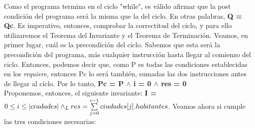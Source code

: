 \documentclass[10pt,a4paper]{article}
\begin{document}
Como el programa termina en el ciclo "while", es válido afirmar que la post condición del programa será la misma que la del ciclo. En otras palabras, \textbf{Q = Qc}. Es imperativo, entonces, comprobar la correctitud del ciclo, y para ello utilizaremos el Teorema del Invariante y el Teorema de Terminación.
Veamos, en primer lugar, cuál es la precondición del ciclo. Sabemos que esta será la precondición del programa, más cualquier instrucción hasta llegar al comienzo del ciclo. Entonces, podemos decir que, como P es todas las condiciones establecidas en los \textit{requiere}, entonces Pc lo será también, sumadas las dos instrucciones antes de llegar al ciclo. Por lo tanto, \textbf{Pc = P $\wedge$ i = 0 $\wedge$ res = 0}\\
    Proponemos, entonces, el siguiente invariante: \textbf{I = $0 \leq i \leq |ciudades| \land _L res = \sum\limits_{j=0}^{i - 1}ciudades[j].habitantes$}. Veamos ahora si cumple las tres condiciones necesarias: \\
\end{document}
